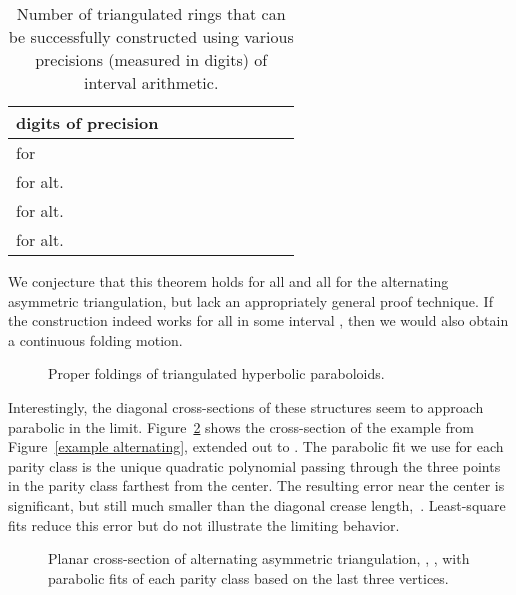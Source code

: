 \documentclass[11pt,letterpaper]{article}
\begin{document}
\begin{table}
  \centering
  \begin{tabular}{l|rrrrrrrr}
    digits of precision &  &  &  &  &  &  &  & 
    \\ \hline
     for  &   &   &  &   &   &   & 
    \\
     for  alt.&   &   &  &   &   &   & 
    \\
     for  alt.&   &   &  &   &   &   & 
    \\
     for  alt.&   &   &   &   &   &   &  & 
  \end{tabular}
  \caption{Number  of triangulated rings that can be successfully
    constructed using various precisions (measured in digits) of interval
    arithmetic.}
  \label{precision}
\end{table}

We conjecture that this theorem holds for all  and all
 for the alternating asymmetric triangulation,
but lack an appropriately general proof technique.
If the construction indeed works for all  in some interval
, then we would also obtain a continuous folding motion.

\begin{figure}
  \centering
  \hfil
  \caption{Proper foldings of triangulated hyperbolic paraboloids.}
  \label{triangulated hypar}
\end{figure}

Interestingly, the diagonal cross-sections of these structures seem to
approach parabolic in the limit.  Figure~\ref{zigzagall} shows the
 cross-section of the example from
Figure~\ref{example alternating}, extended out to .
The parabolic fit we use for each parity class is the unique quadratic
polynomial passing through the three points in the parity class farthest
from the center.  The resulting error near the center is significant, but
still much smaller than the diagonal crease length,~.
Least-square fits reduce this error
but do not illustrate the limiting behavior.

\begin{figure}
  \centering
  \begin{minipage}{1.9in}
  \end{minipage}\hfill
  \begin{minipage}{4in}
  \end{minipage}
  \caption{Planar cross-section of alternating asymmetric triangulation,
           , , with parabolic fits of each parity
           class based on the last three vertices.}
  \label{zigzagall}
\end{figure}
\end{document}
